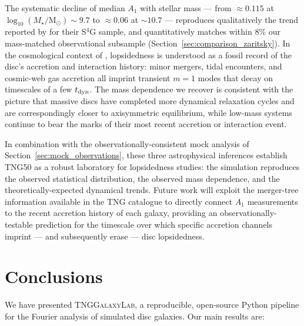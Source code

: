 \documentclass[fleqn,usenatbib]{mnras}
\newcommand{\Am}[1]{A_{#1}}
\newcommand{\Msun}{\mathrm{M}_{\odot}}
\newcommand{\Amone}{\ensuremath{\Am{1}}}
\newcommand{\pipeline}{\textsc{TNGGalaxyLab}}
\begin{document}
The systematic decline of median $\Amone$ with stellar mass ---
from $\approx 0.115$ at $\log_{10}(M_\star/\Msun) \sim 9.7$ to
$\approx 0.06$ at $\sim 10.7$ ---
reproduces qualitatively the trend reported by \citet{2013ApJ...772..135Z}
for their S$^{4}$G sample, and quantitatively matches within
$8\%$ our mass-matched observational subsample
(Section~\ref{sec:comparison_zaritsky}).  In the cosmological
context of \citet{2009PhR...471...75J}, lopsidedness is understood as
a fossil record of the disc's accretion and interaction history:
minor mergers, tidal encounters, and cosmic-web gas accretion all
imprint transient $m=1$ modes that decay on timescales of a few
$t_{\rm dyn}$.  The mass dependence we recover is consistent with
the picture that massive discs have completed more dynamical
relaxation cycles and are correspondingly closer to axisymmetric
equilibrium, while low-mass systems continue to bear the marks of
their most recent accretion or interaction event.

In combination with the observationally-consistent mock analysis
of Section~\ref{sec:mock_observations}, these three astrophysical
inferences establish TNG50 as a robust laboratory for lopsidedness
studies: the simulation reproduces the observed statistical
distribution, the observed mass dependence, and the theoretically-expected
dynamical trends.  Future work will exploit the merger-tree
information available in the TNG catalogue to directly connect
$\Amone$ measurements to the recent accretion history of each
galaxy, providing an observationally-testable prediction for the
timescale over which specific accretion channels imprint --- and
subsequently erase --- disc lopsidedness.

\section{Conclusions}
\label{sec:conclusions}

We have presented \pipeline, a reproducible, open-source Python
pipeline for the Fourier analysis of simulated disc galaxies.
Our main results are:
\end{document}
